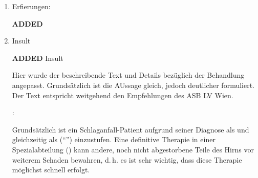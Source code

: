 \documentclass[
ngerman,
paper=a4,
asymmetric,
fontsize=10pt,
headings=small,
draft=false,
numbers=noenddot,
bibtotocnumbered,
footnotes=multiple,
]{scrreprt}
\newcommand{\jNEU}{{\color{green}\sffamily\textbf{ADDED}\hrulefill\newline\newline}}
\newcommand{\jNEUende}{\newline{\color{green}\rule{\linewidth}{3pt}\newline}}
\begin{document}
\begin{enumerate}
\jNEU
\begin{PictureSeriesWide}{}{Bilderserie: }
{./images/fraktur_fehlstellung_nativ.jpg}
{Fehlstellung einer
Unterschenkelfraktur nach einem Verkehrsunfall (PKW gegen
Fußgänger) in natura {\ldots} }
{./images/fraktur_fehlstellung_xray.jpg}
{{\ldots} und in Röntgendarstellung }
{./images/trauma/fraktur-offen-finger.jpg}
{Nicht immer sind offene Frakturen
spektakulär: Offene Fraktur des Mittelfingers
}
{}
{}
\end{PictureSeriesWide}
\jNEUende

\item Erfierungen:

\jNEU
{}
\jNEUende



\item Insult

\jNEU
\Text
{Insult}
{Hier wurde der beschreibende Text und Details bezüglich der
Behandlung angepasst. Grundsätzlich ist die AUssage gleich,
jedoch deutlicher formuliert. Der Text entspricht weitgehend
den Empfehlungen des ASB LV Wien.

\bigskip

: 

Grundsätzlich
ist ein Schlaganfall-Patient aufgrund seiner Diagnose als  und gleichzeitig als 
(\enquote{}) einzustufen. 
Eine definitive Therapie in einer Spezialabteilung
() kann andere, noch nicht abgestorbene
Teile des Hirns vor weiterem Schaden bewahren, d.\,h. es ist
sehr wichtig, dass diese Therapie möglichst schnell
erfolgt.
% 


}
\end{enumerate}
\end{document}
